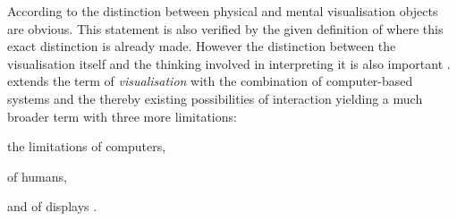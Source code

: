According to \citeauthor{Phillips2010} the distinction between physical and mental visualisation objects are obvious. This statement is also verified by the given definition of \citeauthor{mccormick:1987} where this exact distinction is already made. However the distinction between the visualisation itself and the thinking involved in interpreting it is also important . \citeauthor{Munzner2014} extends the term of \textit{visualisation} with the combination of computer-based systems and the thereby existing possibilities of interaction yielding a much broader term with three more limitations:
\begin{enumerate*}[label={(\arabic*)}]
\item the limitations of computers,
\item of humans,
\item and of displays .
\end{enumerate*}

\cbend